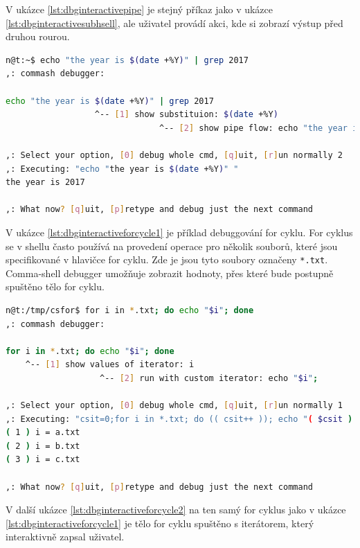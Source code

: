 \documentclass[thesis=M,czech]{FITthesis}[2012/06/26]
\begin{document}
V ukázce \ref{lst:dbginteractivepipe} je stejný příkaz jako v ukázce \ref{lst:dbginteractivesubhsell}, ale uživatel provádí akci, kde si zobrazí výstup před druhou rourou.

\begin{minipage}{\linewidth}
\begin{lstlisting}[language=bash, caption={Debugger interaktivního shellu - subshell}, label={lst:dbginteractivepipe}]
n@t:~$ echo "the year is $(date +%Y)" | grep 2017
,: commash debugger:

echo "the year is $(date +%Y)" | grep 2017
                  ^-- [1] show substituion: $(date +%Y)
                               ^-- [2] show pipe flow: echo "the year is $(date +%Y)" 

,: Select your option, [0] debug whole cmd, [q]uit, [r]un normally 2
,: Executing: "echo "the year is $(date +%Y)" "
the year is 2017

,: What now? [q]uit, [p]retype and debug just the next command
\end{lstlisting}
\end{minipage}

V ukázce \ref{lst:dbginteractiveforcycle1} je příklad debuggování for cyklu. For cyklus se v shellu často používá na provedení operace pro několik souborů, které jsou specifikované v hlavičce for cyklu. Zde je jsou tyto soubory označeny \texttt{*.txt}. Comma-shell debugger umožňuje zobrazit hodnoty, přes které bude postupně spuštěno tělo for cyklu.

\begin{minipage}{\linewidth}
\begin{lstlisting}[language=bash, caption={Debugger interaktivního shellu - výpis hodnot iterátoru for cyklu }, label={lst:dbginteractiveforcycle1}]
n@t:/tmp/csfor$ for i in *.txt; do echo "$i"; done
,: commash debugger:

for i in *.txt; do echo "$i"; done
    ^-- [1] show values of iterator: i
                   ^-- [2] run with custom iterator: echo "$i";

,: Select your option, [0] debug whole cmd, [q]uit, [r]un normally 1
,: Executing: "csit=0;for i in *.txt; do (( csit++ )); echo "( $csit ) i = $i"; done"
( 1 ) i = a.txt
( 2 ) i = b.txt
( 3 ) i = c.txt

,: What now? [q]uit, [p]retype and debug just the next command
\end{lstlisting}
\end{minipage}

V další ukázce \ref{lst:dbginteractiveforcycle2} na ten samý for cyklus jako v ukázce \ref{lst:dbginteractiveforcycle1} je tělo for cyklu spuštěno s iterátorem, který interaktivně zapsal uživatel.
\end{document}
